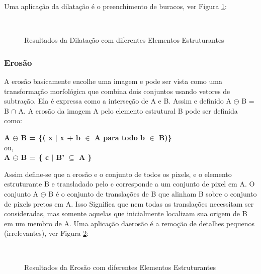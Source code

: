 \documentclass[letterpaper, 10 pt, conference]{ieeeconf}  %
\begin{document}
Uma aplicação da dilatação é o preenchimento de buracos, ver Figura
\ref{fig:Figura01}:

\begin{figure}[H] \centering

\\


\caption{Resultados da Dilatação com diferentes Elementos Estruturantes}
\label{fig:Figura01}
\end{figure}

\subsubsection{Erosão}

A erosão basicamente encolhe uma imagem e pode ser vista como uma transformação
morfológica que combina dois conjuntos usando vetores de subtração. Ela é
expressa como a interseção de A e B. Assim e definido A $\ominus$ B = B $\cap$
A. A erosão da imagem A pelo elemento estrutural B pode ser definida como:

\begin{center}

\textbf {A $\ominus$ B = \{( x $\mid$ x + b $\in$ A para todo b $\in$ B)\}}\\

ou,\\

\textbf { A $\ominus$  B = \{ c $\mid$  B’ $\subseteq $ A \} }

\end{center}

Assim define-se que a erosão e o conjunto de todos os pixels, e o elemento
estruturante B e transladado pelo c corresponde a um conjunto de pixel em A. O
conjunto A $\ominus$ B é o conjunto de translações de B que alinham B sobre o
conjunto de pixels pretos em A. Isso Significa que nem todas as translações
necessitam ser consideradas, mas somente aquelas que inicialmente localizam sua
origem de B em um membro de A. Uma aplicação daerosão é a remoção de detalhes
pequenos (irrelevantes),  ver Figura \ref{fig:Figura02}:

\begin{figure}[H] \centering

\\


\caption{Resultados da Erosão com diferentes Elementos Estruturantes}
\label{fig:Figura02}
\end{figure}
\end{document}
